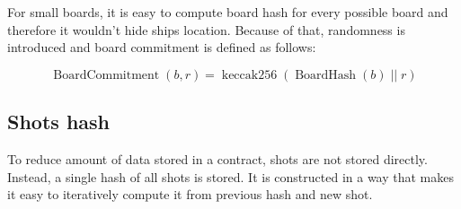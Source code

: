 \documentclass{article}
\begin{document}
    For small boards, it is easy to compute board hash for every possible board and therefore it wouldn't hide ships location. Because of that, randomness is introduced and board commitment is defined as follows:

    \[ \operatorname{BoardCommitment}(b,r) = \operatorname{keccak256}(\operatorname{BoardHash}(b) \; || \; r) \]

    \subsection{Shots hash}

    To reduce amount of data stored in a contract, shots are not stored directly. Instead, a single hash of all shots is stored. It is constructed in a way that makes it easy to iteratively compute it from previous hash and new shot.
\end{document}
